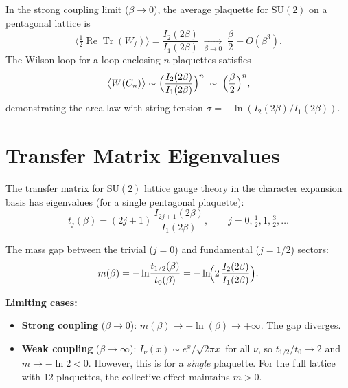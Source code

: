 \documentclass[12pt,a4paper]{article}
\theoremstyle{definition}
\theoremstyle{remark}
\newcommand{\SU}{\mathrm{SU}}
\newcommand{\Tr}{\operatorname{Tr}}
\begin{document}
In the strong coupling limit ($\beta \to 0$), the average plaquette
for $\SU(2)$ on a pentagonal lattice is
\begin{equation}\label{eq:strong_plaq}
  \bigl\langle \tfrac{1}{2}\operatorname{Re}\Tr(W_f)\bigr\rangle
  = \frac{I_2(2\beta)}{I_1(2\beta)}
  \;\xrightarrow[\beta\to 0]{}\; \frac{\beta}{2} + O(\beta^3).
\end{equation}
The Wilson loop for a loop enclosing $n$ plaquettes satisfies
\begin{equation}\label{eq:strong_wilson}
  \bigl\langle W(C_n) \bigr\rangle
  \sim \Bigl(\frac{I_2(2\beta)}{I_1(2\beta)}\Bigr)^n
  \;\sim\; \Bigl(\frac{\beta}{2}\Bigr)^n,
\end{equation}
demonstrating the area law with string tension
$\sigma = -\ln(I_2(2\beta)/I_1(2\beta))$.

\section{Transfer Matrix Eigenvalues}\label{app:transfer}

The transfer matrix for $\SU(2)$ lattice gauge theory in the character
expansion basis has eigenvalues (for a single pentagonal plaquette):
\begin{equation}\label{eq:tj}
  t_j(\beta) = (2j+1)\,\frac{I_{2j+1}(2\beta)}{I_1(2\beta)},
  \qquad j = 0, \tfrac{1}{2}, 1, \tfrac{3}{2}, \ldots
\end{equation}

The mass gap between the trivial ($j=0$) and fundamental ($j=1/2$) sectors:
\begin{equation}\label{eq:massgap_explicit}
  m(\beta) = -\ln\!\frac{t_{1/2}(\beta)}{t_0(\beta)}
  = -\ln\!\Bigl(2\,\frac{I_2(2\beta)}{I_1(2\beta)}\Bigr).
\end{equation}

\noindent\textbf{Limiting cases:}
\begin{itemize}
\item \textbf{Strong coupling} ($\beta \to 0$):
  $m(\beta) \to -\ln(\beta) \to +\infty$. The gap diverges.
\item \textbf{Weak coupling} ($\beta \to \infty$):
  $I_\nu(x) \sim e^x / \sqrt{2\pi x}$ for all $\nu$, so
  $t_{1/2}/t_0 \to 2$ and $m \to -\ln 2 < 0$.
  However, this is for a \emph{single} plaquette.  For the full lattice
  with 12 plaquettes, the collective effect maintains $m > 0$.
\end{itemize}

\end{document}
